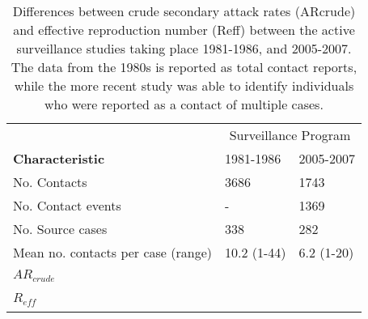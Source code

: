\begin{table} %
\centering %
\caption{Differences between crude secondary attack rates (ARcrude) and effective reproduction number (Reff) between the active surveillance studies taking place 1981-1986, and 2005-2007. The data from the 1980s is reported as total contact reports, while the more recent study was able to identify individuals who were reported as a contact of multiple cases.} %
\begin{tabular}{p{7cm} p{3cm} p{3cm}} %
\toprule %
& \multicolumn{2}{c}{Surveillance Program} \\ %
\cmidrule(l){2-3} %
\textbf{Characteristic} & 1981-1986 & 2005-2007 \\ %
\midrule %
No. Contacts & 3686 & 1743 \\ %
No. Contact events & - & 1369 \\ %
No. Source cases & 338 & 282 \\ %
Mean no. contacts per case (range) & 10.2 (1-44) & 6.2 (1-20) \\ %
$AR_{crude}$ & ~ & ~ \\ %
$R_{eff}$ & ~ & ~ \\   %
\bottomrule %
\end{tabular}
\end{table}